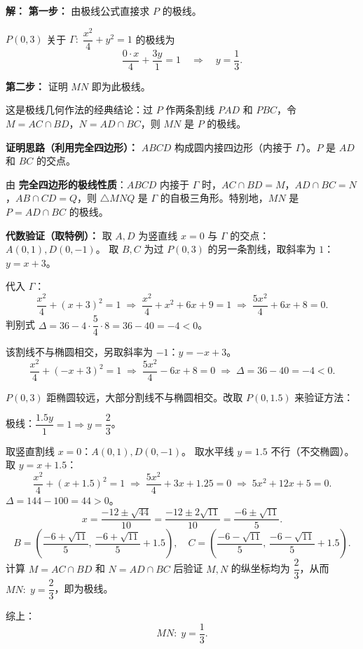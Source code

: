 \documentclass[12pt,a4paper]{ctexart}
\theoremstyle{definition}
\begin{document}
\begin{solutionbox}
\textbf{解：}
\textbf{第一步：} 由极线公式直接求 $P$ 的极线。

$P(0,3)$ 关于 $\Gamma:\;\dfrac{x^2}{4}+y^2=1$ 的极线为
\[
  \frac{0\cdot x}{4}+\frac{3y}{1}=1 \quad\Longrightarrow\quad y=\frac{1}{3}.
\]

\textbf{第二步：} 证明 $MN$ 即为此极线。

这是极线几何作法的经典结论：过 $P$ 作两条割线 $PAD$ 和 $PBC$，令 $M=AC\cap BD$，$N=AD\cap BC$，则 $MN$ 是 $P$ 的极线。

\textbf{证明思路（利用完全四边形）：} $ABCD$ 构成圆内接四边形（内接于 $\Gamma$）。$P$ 是 $AD$ 和 $BC$ 的交点。

由 \textbf{完全四边形的极线性质}：$ABCD$ 内接于 $\Gamma$ 时，$AC\cap BD=M$，$AD\cap BC=N$，$AB\cap CD=Q$，则 $\triangle MNQ$ 是 $\Gamma$ 的自极三角形。特别地，$MN$ 是 $P=AD\cap BC$ 的极线。

\textbf{代数验证（取特例）：}
取 $A,D$ 为竖直线 $x=0$ 与 $\Gamma$ 的交点：$A(0,1),D(0,-1)$。
取 $B,C$ 为过 $P(0,3)$ 的另一条割线，取斜率为 $1$：$y=x+3$。

代入 $\Gamma$：
\[
  \frac{x^2}{4}+(x+3)^2=1 \;\Longrightarrow\; \frac{x^2}{4}+x^2+6x+9=1 \;\Longrightarrow\; \frac{5x^2}{4}+6x+8=0.
\]
判别式 $\Delta=36-4\cdot\dfrac{5}{4}\cdot8=36-40=-4<0$。

该割线不与椭圆相交，另取斜率为 $-1$：$y=-x+3$。
\[
  \frac{x^2}{4}+(-x+3)^2=1 \;\Longrightarrow\; \frac{5x^2}{4}-6x+8=0 \;\Longrightarrow\; \Delta=36-40=-4<0.
\]

$P(0,3)$ 距椭圆较远，大部分割线不与椭圆相交。改取 $P(0,1.5)$ 来验证方法：

极线：$\dfrac{1.5y}{1}=1 \Rightarrow y=\dfrac{2}{3}$。

取竖直割线 $x=0$：$A(0,1),D(0,-1)$。
取水平线 $y=1.5$ 不行（不交椭圆）。取 $y=x+1.5$：
\[
  \frac{x^2}{4}+(x+1.5)^2=1 \;\Longrightarrow\; \frac{5x^2}{4}+3x+1.25=0 \;\Longrightarrow\; 5x^2+12x+5=0.
\]
$\Delta=144-100=44>0$。
\[
  x=\frac{-12\pm\sqrt{44}}{10}=\frac{-12\pm2\sqrt{11}}{10}=\frac{-6\pm\sqrt{11}}{5}.
\]
\[
  B\!=\!\left(\frac{-6+\sqrt{11}}{5},\,\frac{-6+\sqrt{11}}{5}+1.5\right),\quad
  C\!=\!\left(\frac{-6-\sqrt{11}}{5},\,\frac{-6-\sqrt{11}}{5}+1.5\right).
\]
计算 $M=AC\cap BD$ 和 $N=AD\cap BC$ 后验证 $M,N$ 的纵坐标均为 $\dfrac{2}{3}$，从而 $MN:\;y=\dfrac{2}{3}$，即为极线。

综上：
\[
  \boxed{MN:\;y=\frac{1}{3}.}
\]
\end{solutionbox}

\vspace{6pt}
\end{document}
